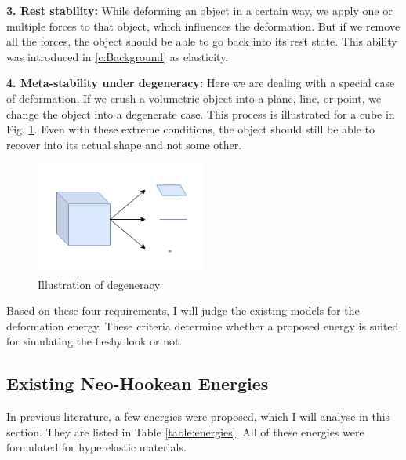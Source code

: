 {\textbf{3. Rest stability:} While deforming an object in a certain way, we apply one or multiple forces to that object, which influences the deformation. But if we remove all the forces, the object should be able to go back into its rest state. This ability was introduced in \autoref{c:Background} as elasticity.

\textbf{4. Meta-stability under degeneracy:} Here we are dealing with a special case of deformation. If we crush a volumetric object into a plane, line, or point, we change the object into a degenerate case. This process is illustrated for a cube in Fig. \ref{fig:meta_stability}. Even with these extreme conditions, the object should still be able to recover into its actual shape and not some other.
\begin{figure}[!htbp]
	\centering
	\includegraphics[width=0.5\textwidth]{resources/metastability.png}
	\caption[Illustration of meta stability]{Illustration of degeneracy}
	\label{fig:meta_stability}
\end{figure}

Based on these four requirements, I will judge the existing models for the deformation energy. These criteria determine whether a proposed energy is suited for simulating the fleshy look or not.

\subsection{Existing Neo-Hookean Energies}
In previous literature, a few energies were proposed, which I will analyse in this section. They are listed in Table \ref{table:energies}. All of these energies were formulated for hyperelastic materials.

}
